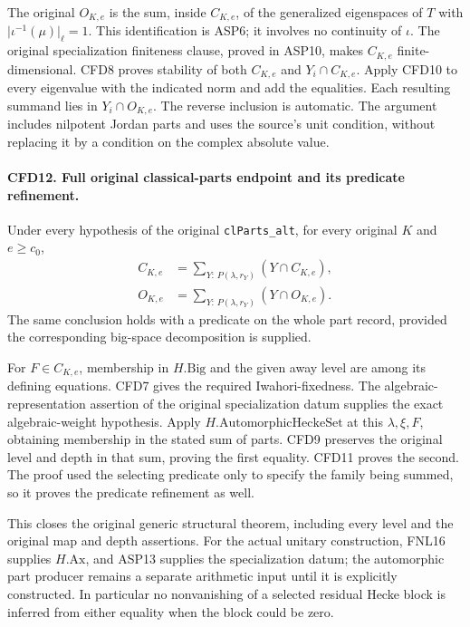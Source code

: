 \documentclass[11pt,a4paper]{article}
\numberwithin{equation}{section}
\theoremstyle{remark}\newtheorem{remark}[theorem]{Remark}
\begin{document}
The original \(O_{K,e}\) is the sum, inside \(C_{K,e}\), of the
generalized eigenspaces of \(T\) with
\(\lvert\iota^{-1}(\mu)\rvert_\ell=1\).  This identification is ASP6;
it involves no continuity of \(\iota\).  The original specialization
finiteness clause, proved in ASP10, makes \(C_{K,e}\) finite-dimensional.
CFD8 proves stability of both \(C_{K,e}\) and \(Y_i\cap C_{K,e}\).
Apply CFD10 to every eigenvalue with the indicated norm and add the
equalities.  Each resulting summand lies in \(Y_i\cap O_{K,e}\).
The reverse inclusion is automatic.  The argument includes nilpotent
Jordan parts and uses the source's unit condition, without replacing it
by a condition on the complex absolute value.

\paragraph{CFD12. Full original classical-parts endpoint and its predicate refinement.}
\label{claim:CFD12}
Under every hypothesis of the original \texttt{cl\allowbreak Parts\_\allowbreak alt}, for every
original \(K\) and \(e\ge c_0\),
\begin{align*}
 C_{K,e}&=\sum_{Y:\,P(\lambda,r_Y)}(Y\cap C_{K,e}),\\
 O_{K,e}&=\sum_{Y:\,P(\lambda,r_Y)}(Y\cap O_{K,e}).
\end{align*}
The same conclusion holds with a predicate on the whole part record,
provided the corresponding big-space decomposition is supplied.

For \(F\in C_{K,e}\), membership in \(H.\mathrm{Big}\) and the
given away level are among its defining equations.  CFD7 gives the
required Iwahori-fixedness.  The algebraic-representation assertion of
the original specialization datum supplies the exact algebraic-weight
hypothesis.  Apply \(H.\mathrm{AutomorphicHeckeSet}\) at this
\(\lambda,\xi,F\), obtaining membership in the stated sum of parts.
CFD9 preserves the original level and depth in that sum, proving the
first equality.  CFD11 proves the second.  The proof used the selecting
predicate only to specify the family being summed, so it proves the
predicate refinement as well.

This closes the original generic structural theorem, including every
level and the original map and depth assertions.  For the actual unitary
construction, FNL16 supplies \(H.\mathrm{Ax}\), and ASP13 supplies
the specialization datum; the automorphic part producer remains a
separate arithmetic input until it is explicitly constructed.  In
particular no nonvanishing of a selected residual Hecke block is inferred
from either equality when the block could be zero.
\end{document}
